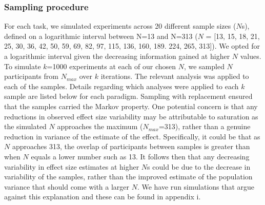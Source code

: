 \documentclass{article}
\begin{document}
\hypertarget{sampling-procedure}{%
\subsubsection{Sampling procedure}\label{sampling-procedure}}

\label{sec:SamplingProc}

For each task, we simulated experiments across 20 different sample sizes (\(N\)s), defined on a logarithmic interval between N=13 and N=313 (\(N\) = {[}13, 15, 18, 21, 25, 30, 36, 42, 50, 59, 69, 82, 97, 115, 136, 160, 189. 224, 265, 313{]}). We opted for a logarithmic interval given the decreasing information gained at higher \(N\) values. To simulate \(k\)=1000 experiments at each of our chosen \(N\), we sampled \(N\) participants from \(N_{max}\) over \(k\) iterations. The relevant analysis was applied to each of the samples. Details regarding which analyses were applied to each \(k\) sample are listed below for each paradigm. Sampling with replacement ensured that the samples carried the Markov property. One potential concern is that any reductions in observed effect size variability may be attributable to saturation as the simulated \(N\) approaches the maximum (\(N_{max}\)=313), rather than a genuine reduction in variance of the estimate of the effect. Specifically, it could be that as \(N\) approaches 313, the overlap of participants between samples is greater than when \(N\) equals a lower number such as 13. It follows then that any decreasing variability in effect size estimates at higher \(N\)s could be due to the decrease in variability of the samples, rather than the improved estimate of the population variance that should come with a larger \(N\). We have run simulations that argue against this explanation and these can be found in appendix i.
\end{document}
